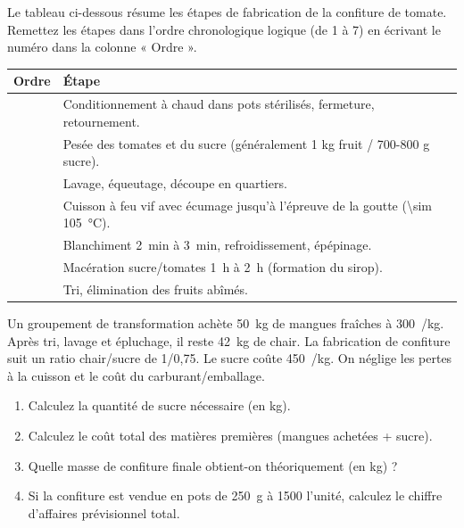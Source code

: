 \documentclass[11pt]{article}
\begin{document}
\begin{exercice}
Le tableau ci-dessous résume les étapes de fabrication de la confiture de tomate. Remettez les étapes dans l'ordre chronologique logique (de 1 à 7) en écrivant le numéro dans la colonne « Ordre ».
\begin{center}
\begin{tabular}{|c|p{10cm}|}
\hline
\textbf{Ordre} & \textbf{Étape} \\
\hline
\dotfill & Conditionnement à chaud dans pots stérilisés, fermeture, retournement. \\
\hline
\dotfill & Pesée des tomates et du sucre (généralement 1 kg fruit / 700-800 g sucre). \\
\hline
\dotfill & Lavage, équeutage, découpe en quartiers. \\
\hline
\dotfill & Cuisson à feu vif avec écumage jusqu'à l'épreuve de la goutte (\SI{\sim 105}{\celsius}). \\
\hline
\dotfill & Blanchiment \SI{2}{\minute} à \SI{3}{\minute}, refroidissement, épépinage. \\
\hline
\dotfill & Macération sucre/tomates \SI{1}{\hour} à \SI{2}{\hour} (formation du sirop). \\
\hline
\dotfill & Tri, élimination des fruits abîmés. \\
\hline
\end{tabular}
\end{center}
\end{exercice}

\begin{exercice}
Un groupement de transformation achète \SI{50}{\kg} de mangues fraîches à \SI{300}{/\kg}. Après tri, lavage et épluchage, il reste \SI{42}{\kg} de chair. La fabrication de confiture suit un ratio chair/sucre de 1/0,75. Le sucre coûte \SI{450}{/\kg}. On néglige les pertes à la cuisson et le coût du carburant/emballage.
\begin{enumerate}
    \item Calculez la quantité de sucre nécessaire (en kg).
    \item Calculez le coût total des matières premières (mangues achetées + sucre).
    \item Quelle masse de confiture finale obtient-on théoriquement (en kg) ?
    \item Si la confiture est vendue en pots de \SI{250}{\g} à \SI{1500}{} l'unité, calculez le chiffre d'affaires prévisionnel total.
\end{enumerate}
\end{exercice}
\end{document}

